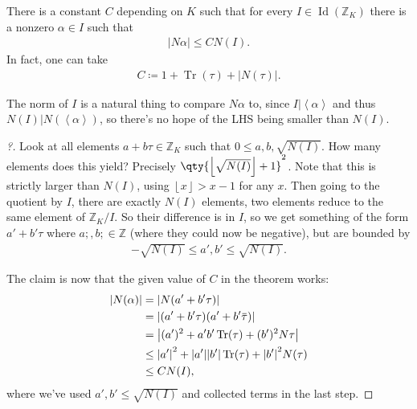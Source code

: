 \begin{lemma}[?]

There is a constant \(C\) depending on \(K\) such that for every
\(I \in \operatorname{Id}({\mathbb{Z}}_K)\) there is a nonzero
\(\alpha\in I\) such that
\begin{align*}
{\left\lvert {N \alpha} \right\rvert}\leq C N(I) 
.\end{align*}
In fact, one can take
\begin{align*}
C \coloneqq 1 + \operatorname{Tr}(\tau) + {\left\lvert {N(\tau)} \right\rvert} 
.\end{align*}

\end{lemma}

\begin{remark}

The norm of \(I\) is a natural thing to compare \(N \alpha\) to, since
\(I \mathrel{\Big|}\left\langle{ \alpha }\right\rangle\) and thus
\(N(I) \mathrel{\Big|}N(\left\langle{ \alpha }\right\rangle)\), so
there's no hope of the LHS being smaller than \(N(I)\).

\end{remark}

\begin{proof}[?]

Look at all elements \(a + b \tau \in {\mathbb{Z}}_K\) such that
\(0 \leq a,b, \sqrt{ N(I) }\). How many elements does this yield?
Precisely \(\qty{ {\left\lfloor \sqrt{N(I)} \right\rfloor} +1 }^2\).
Note that this is strictly larger than \(N(I)\), using
\({\left\lfloor x \right\rfloor} > x-1\) for any \(x\). Then going to
the quotient by \(I\), there are exactly \(N(I)\) elements, two elements
reduce to the same element of \({\mathbb{Z}}_K/I\). So their difference
is in \(I\), so we get something of the form \(a' + b' \tau\) where
\(a;, b; \in {\mathbb{Z}}\) (where they could now be negative), but are
bounded by
\begin{align*}
- \sqrt{N(I)}
\leq a', b' \leq 
 \sqrt{N(I)} 
.\end{align*}

The claim is now that the given value of \(C\) in the theorem works:
\begin{align*}
{\left\lvert {N( \alpha)} \right\rvert}
&=
{\left\lvert {N( a' + b' \tau)} \right\rvert} \\
&=
{\left\lvert {(a' + b' \tau) (a' + b' \mkern 1.5mu\overline{\mkern-1.5mu\tau\mkern-1.5mu}\mkern 1.5mu)} \right\rvert} \\
&= {\left\lvert {(a')^2 + a'b' \operatorname{Tr}(\tau) + (b')^2 N \tau} \right\rvert} \\
&\leq 
{\left\lvert {a'} \right\rvert}^2 + {\left\lvert {a'} \right\rvert} {\left\lvert {b'} \right\rvert} \operatorname{Tr}(\tau) + {\left\lvert {b'} \right\rvert}^2 N(\tau) \\
&\leq C N(I)
,\end{align*}
where we've used \(a', b' \leq \sqrt{N(I)}\) and collected terms in the
last step.

\end{proof}

